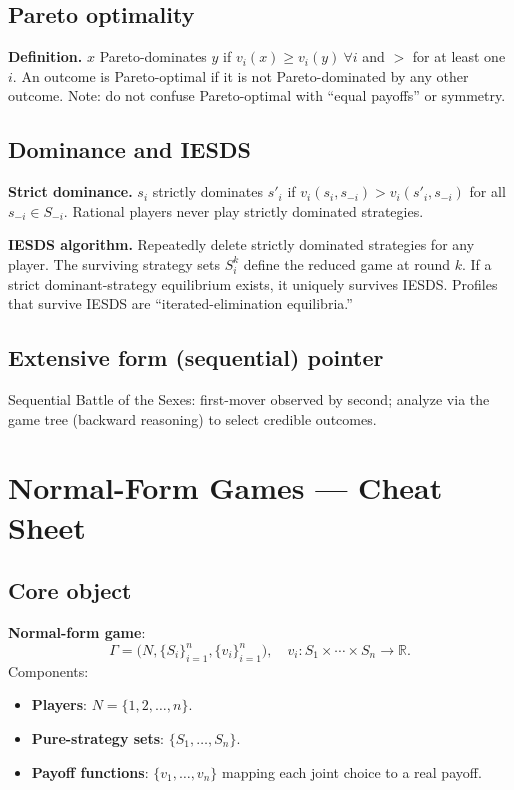 \documentclass[9pt]{article}
\begin{document}
\subsection*{Pareto optimality}
\textbf{Definition.} $x$ Pareto-dominates $y$ if $v_i(x)\ge v_i(y)\ \forall i$ and $> $ for at least one $i$.
An outcome is Pareto-optimal if it is not Pareto-dominated by any other outcome.
Note: do not confuse Pareto-optimal with “equal payoffs” or symmetry.

\subsection*{Dominance and IESDS}
\textbf{Strict dominance.} $s_i$ strictly dominates $s'_i$ if $v_i(s_i,s_{-i})>v_i(s'_i,s_{-i})$ for all $s_{-i}\in S_{-i}$.
Rational players never play strictly dominated strategies.

\textbf{IESDS algorithm.} Repeatedly delete strictly dominated strategies for any player. The surviving strategy sets $S_i^k$ define the reduced game at round $k$.
If a strict dominant-strategy equilibrium exists, it uniquely survives IESDS.
Profiles that survive IESDS are “iterated-elimination equilibria.”

\subsection*{Extensive form (sequential) pointer}
Sequential Battle of the Sexes: first-mover observed by second; analyze via the game tree (backward reasoning) to select credible outcomes.

\newpage
\section*{Normal-Form Games — Cheat Sheet}

\subsection*{Core object}
\textbf{Normal-form game}:
\[
\Gamma=\bigl(N,\{S_i\}_{i=1}^n,\{v_i\}_{i=1}^n\bigr),
\quad
v_i:S_1\times\cdots\times S_n\to\mathbb{R}.
\]
Components:
\begin{itemize}
  \item \textbf{Players}: $N=\{1,2,\dots,n\}$.
  \item \textbf{Pure-strategy sets}: $\{S_1,\dots,S_n\}$.
  \item \textbf{Payoff functions}: $\{v_1,\dots,v_n\}$ mapping each joint choice to a real payoff.
\end{itemize}
\end{document}
